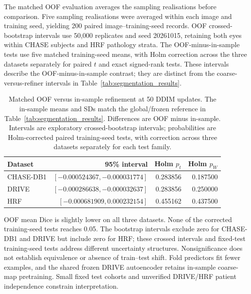 \documentclass[jimaging,article,submit,pdftex,moreauthors]
  {Definitions/mdpi}
\begin{document}
The matched OOF evaluation averages the sampling realisations before comparison. Five sampling realisations were averaged within each image and training seed, yielding 200 paired image--training-seed records. OOF crossed-bootstrap intervals use 50,000 replicates and seed 20261015, retaining both eyes within CHASE subjects and HRF pathology strata. The OOF-minus-in-sample tests use five matched training-seed means, with Holm correction across the three datasets separately for paired $t$ and exact signed-rank tests. These intervals describe the OOF-minus-in-sample contrast; they are distinct from the coarse-versus-refiner intervals in Table~\ref{tab:segmentation_results}.

\begin{table}[htbp]
\centering
\caption{Matched OOF versus in-sample refinement at 50 DDIM updates. The in-sample means and SDs match the global/frozen reference in Table~\ref{tab:segmentation_results}. Differences are OOF minus in-sample. Intervals are exploratory crossed-bootstrap intervals; probabilities are Holm-corrected paired training-seed tests, with correction across three datasets separately for each test family.}
\label{tab:matched_oof_existing}
\small
{}
\par\medskip
\begin{tabular}{lrrr}
\toprule
Dataset & 95\% interval & Holm $p_t$ & Holm $p_W$ \\
\midrule
CHASE-DB1 & $[-0.000524367,-0.000031774]$ & 0.283856 & 0.187500 \\
DRIVE & $[-0.000286638,-0.000032637]$ & 0.283856 & 0.250000 \\
HRF & $[-0.000681909,0.000232154]$ & 0.455162 & 0.437500 \\
\bottomrule
\end{tabular}
\end{table}

OOF mean Dice is slightly lower on all three datasets. None of the corrected training-seed tests reaches 0.05. The bootstrap intervals exclude zero for CHASE-DB1 and DRIVE but include zero for HRF; these crossed intervals and fixed-test training-seed tests address different uncertainty structures. Nonsignificance does not establish equivalence or absence of train--test shift. Fold predictors fit fewer examples, and the shared frozen DRIVE autoencoder retains in-sample coarse-map pretraining. Small fixed test cohorts and unverified DRIVE/HRF patient independence constrain interpretation.
\end{document}
